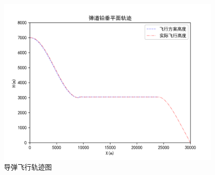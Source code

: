 \documentclass[forprint]{NWPUBachelor}
\begin{document}
\begin{itemize}
\begin{figure}[H]
    \centering
    \includegraphics[width=130mm]{img/飞行轨迹.png}
    \caption{导弹飞行轨迹图}
\end{figure}


\end{itemize}
\end{document}
